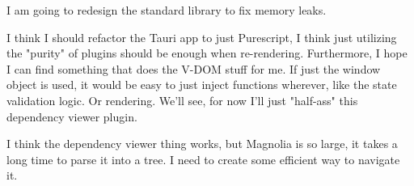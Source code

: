 I am going to redesign the standard library to fix memory leaks.

I think I should refactor the Tauri app to just Purescript, I think just
utilizing the "purity" of plugins should be enough when re-rendering.
Furthermore, I hope I can find something that does the V-DOM stuff for me. If
just the window object is used, it would be easy to just inject functions
wherever, like the state validation logic. Or rendering. We'll see, for now I'll
just "half-ass" this dependency viewer plugin.

I think the dependency viewer thing works, but Magnolia is so large, it takes a
long time to parse it into a tree. I need to create some efficient way to
navigate it.
